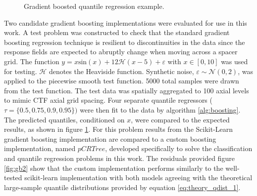 

  


\begin{figure}[H]%
    \centering
    \qquad
    \qquad
    \qquad
    \qquad
    \caption[Gradient boosted quantile regression example.]{Gradient boosted quantile regression example.}%
    \label{fig:gb1}%
\end{figure}

Two candidate gradient boosting implementations were evaluated for use in this work.  A test problem was constructed to check that the standard gradient boosting regression technique is resilient to discontinuities in the data since the response fields are expected to abruptly change when moving across a spacer grid.  The function $y = x \mathrm{sin}(x) +12 \mathcal H(x-5)+\varepsilon$ with $x\in [0,10]$ was used for testing.  $\mathcal H$ denotes the Heaviside function. Synthetic noise, $\varepsilon \sim \mathcal N(0,2)$, was applied to the piecewise smooth test function.   5000 total samples were drawn from the test function. The test data was spatially aggregated to 100 axial levels to mimic CTF axial grid spacing.  Four separate quantile regressors ($\tau = \{0.5, 0.75, 0.9, 0.95 \})$ were then fit to the data by algorithm \ref{alg:boosting}. The predicted quantiles, conditioned on $x$, were compared to the expected results, as shown in figure \ref{fig:gb1}. For this problem results from the Scikit-Learn gradient boosting implementation are compared to a custom boosting implementation, named $pCRTree$, developed specifically to solve the classification and quantile regression problems in this work.  The residuals provided figure \ref{fig:gb2} show that the custom implementation performs similarly to the well-tested scikit-learn implementation with both models agreeing with the theoretical large-sample quantile distributions provided by equation \ref{eq:theory_qdist_1}.

